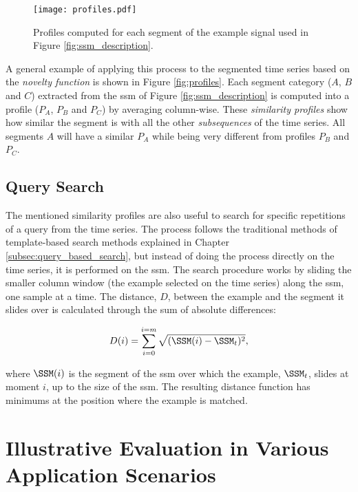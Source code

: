 \begin{figure}
\centering
\texttt{[image: profiles.pdf]}
\caption{Profiles computed for each segment of the example signal used in Figure \ref{fig:ssm_description}.}
\end{figure}

A general example of applying this process to the segmented time series based on the \textit{novelty function} is shown in Figure \ref{fig:profiles}. Each segment category ($A$, $B$ and $C$) extracted from the \gls{ssm} of Figure \ref{fig:ssm_description} is computed into a profile ($P_A$, $P_B$ and $P_C$) by averaging column-wise. These \textit{similarity profiles} show how similar the segment is with all the other \textit{subsequences} of the time series. All segments $A$ will have a similar $P_A$ while being very different from profiles $P_B$ and $P_C$. 

\subsection{Query Search}
\label{subsec:query_based}

The mentioned similarity profiles are also useful to search for specific repetitions of a query from the time series. The process follows the traditional methods of template-based search methods explained in Chapter \ref{subsec:query_based_search}, but instead of doing the process directly on the time series, it is performed on the \gls{ssm}. The search procedure works by sliding the smaller column window (the example selected on the time series) along the \gls{ssm}, one sample at a time. The distance, $D$, between the example and the segment it slides over is calculated through the sum of absolute differences:

\begin{equation}
\label{eq:subsec_search}
    D(i) = \sum_{i=0}^{i=m}{\sqrt{(\SSM(i) - \SSM_t)^2}},
\end{equation}

where $\SSM(i)$ is the segment of the \gls{ssm} over which the example, $\SSM_t$, slides at moment $i$, up to the size of the \gls{ssm}. The resulting distance function has minimums at the position where the example is matched.

\section{Illustrative Evaluation in Various Application Scenarios}
\label{sec:use_cases_ssm}


